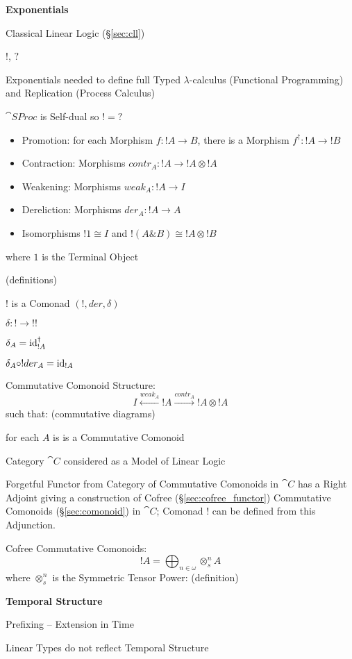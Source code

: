 \textbf{Exponentials}

Classical Linear Logic (\S\ref{sec:cll})

$!$, $?$

Exponentials needed to define full Typed $\lambda$-calculus
(Functional Programming) and Replication (Process Calculus)

$\cat{SProc}$ is Self-dual so $! = ?$

\begin{itemize}
  \item Promotion: for each Morphism $f : !A \rightarrow B$, there is
    a Morphism $f^\dag : !A \rightarrow !B$
  \item Contraction: Morphisms $contr_A : !A \rightarrow !A \otimes
    !A$
  \item Weakening: Morphisms $weak_A : !A \rightarrow I$
  \item Dereliction: Morphisms $der_A : !A \rightarrow A$
  \item Isomorphisms $!1 \cong I$ and $!(A \& B) \cong !A \otimes !B$
\end{itemize}
where $1$ is the Terminal Object

(definitions) %

$!$ is a Comonad $(!,der,\delta)$

$\delta : ! \rightarrow !!$

$\delta_A = \mathrm{id}_{!A}^\dag$

$\delta_A \circ !der_A = \mathrm{id}_{!A}$

Commutative Comonoid Structure:
\[
  I \xleftarrow{weak_A} !A \xrightarrow{contr_A} !A \otimes !A
\]
such that: (commutative diagrams) %

for each $A$ is is a Commutative Comonoid


Category $\cat{C}$ considered as a Model of Linear Logic

Forgetful Functor from Category of Commutative Comonoids in $\cat{C}$
has a Right Adjoint giving a construction of Cofree
(\S\ref{sec:cofree_functor}) Commutative Comonoids
(\S\ref{sec:comonoid}) in $\cat{C}$; Comonad $!$ can be defined from
this Adjunction.

Cofree Commutative Comonoids:
\[
  !A = \bigoplus_{n \in \omega} \otimes^n_s A
\]
where $\otimes^n_s$ is the Symmetric Tensor Power: (definition) %


\asterism


\textbf{Temporal Structure}

Prefixing -- Extension in Time

Linear Types do not reflect Temporal Structure

